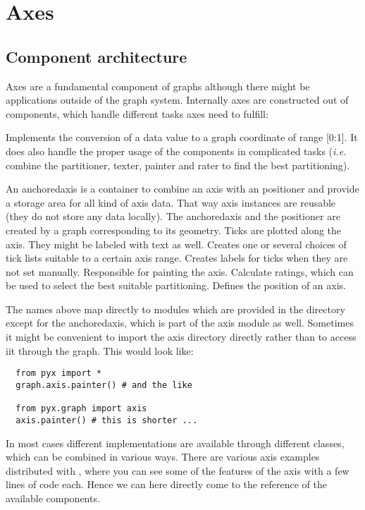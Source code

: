 \chapter{Axes}
\label{axis}
\section{Component architecture} %

Axes are a fundamental component of graphs although there might be
applications outside of the graph system. Internally axes are
constructed out of components, which handle different tasks axes need
to fulfill:

\begin{definitions}
  Implements the conversion of a data value to a graph coordinate of
  range [0:1]. It does also handle the proper usage of the components
  in complicated tasks (\emph{i.e.} combine the partitioner, texter,
  painter and rater to find the best partitioning).

  An anchoredaxis is a container to combine an axis with an positioner
  and provide a storage area for all kind of axis data. That way axis
  instances are reusable (they do not store any data locally). The
  anchoredaxis and the positioner are created by a graph corresponding
  to its geometry.
  Ticks are plotted along the axis. They might be labeled with text as
  well.
  Creates one or several choices of tick lists suitable to a certain
  axis range.
  Creates labels for ticks when they are not set manually.
  Responsible for painting the axis.
  Calculate ratings, which can be used to select the best suitable
  partitioning.
  Defines the position of an axis.
\end{definitions}

The names above map directly to modules which are provided in the
directory  except for the anchoredaxis, which is part
of the axis module as well. Sometimes it might be convenient to import
the axis directory directly rather than to access iit through the
graph. This would look like:
\begin{verbatim}
  from pyx import *
  graph.axis.painter() # and the like

  from pyx.graph import axis
  axis.painter() # this is shorter ...
\end{verbatim}

In most cases different implementations are available through
different classes, which can be combined in various ways. There are
various axis examples distributed with \PyX{}, where you can see some
of the features of the axis with a few lines of code each. Hence we
can here directly come to the reference of the available
components. %

